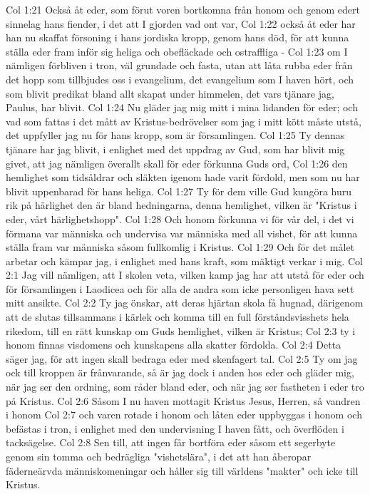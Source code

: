 Col 1:21  Också åt eder, som förut voren bortkomna från honom och genom edert sinnelag hans fiender, i det att I gjorden vad ont var,
Col 1:22  också åt eder har han nu skaffat försoning i hans jordiska kropp, genom hans död, för att kunna ställa eder fram inför sig heliga och obefläckade och ostraffliga -
Col 1:23  om I nämligen förbliven i tron, väl grundade och fasta, utan att låta rubba eder från det hopp som tillbjudes oss i evangelium, det evangelium som I haven hört, och som blivit predikat bland allt skapat under himmelen, det vars tjänare jag, Paulus, har blivit.
Col 1:24  Nu gläder jag mig mitt i mina lidanden för eder; och vad som fattas i det mått av Kristus-bedrövelser som jag i mitt kött måste utstå, det uppfyller jag nu för hans kropp, som är församlingen.
Col 1:25  Ty dennas tjänare har jag blivit, i enlighet med det uppdrag av Gud, som har blivit mig givet, att jag nämligen överallt skall för eder förkunna Guds ord,
Col 1:26  den hemlighet som tidsåldrar och släkten igenom hade varit fördold, men som nu har blivit uppenbarad för hans heliga.
Col 1:27  Ty för dem ville Gud kungöra huru rik på härlighet den är bland hedningarna, denna hemlighet, vilken är "Kristus i eder, vårt härlighetshopp".
Col 1:28  Och honom förkunna vi för vår del, i det vi förmana var människa och undervisa var människa med all vishet, för att kunna ställa fram var människa såsom fullkomlig i Kristus.
Col 1:29  Och för det målet arbetar och kämpar jag, i enlighet med hans kraft, som mäktigt verkar i mig.
Col 2:1  Jag vill nämligen, att I skolen veta, vilken kamp jag har att utstå för eder och för församlingen i Laodicea och för alla de andra som icke personligen hava sett mitt ansikte.
Col 2:2  Ty jag önskar, att deras hjärtan skola få hugnad, därigenom att de slutas tillsammans i kärlek och komma till en full förståndsvisshets hela rikedom, till en rätt kunskap om Guds hemlighet, vilken är Kristus;
Col 2:3  ty i honom finnas visdomens och kunskapens alla skatter fördolda.
Col 2:4  Detta säger jag, för att ingen skall bedraga eder med skenfagert tal.
Col 2:5  Ty om jag ock till kroppen är frånvarande, så är jag dock i anden hos eder och gläder mig, när jag ser den ordning, som råder bland eder, och när jag ser fastheten i eder tro på Kristus.
Col 2:6  Såsom I nu haven mottagit Kristus Jesus, Herren, så vandren i honom
Col 2:7  och varen rotade i honom och låten eder uppbyggas i honom och befästas i tron, i enlighet med den undervisning I haven fått, och överflöden i tacksägelse.
Col 2:8  Sen till, att ingen får bortföra eder såsom ett segerbyte genom sin tomma och bedrägliga "vishetslära", i det att han åberopar fäderneärvda människomeningar och håller sig till världens "makter" och icke till Kristus.
